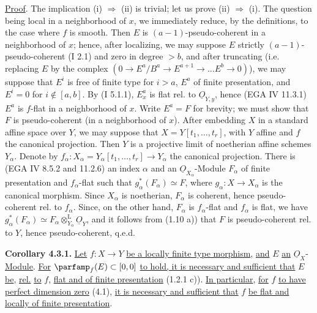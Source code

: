 \uline{Proof}. The implication (i) \(\Longrightarrow\) (ii) is trivial; let us prove (ii) \(\Longrightarrow\) (i). The question being local in a neighborhood of \(x\), we immediately reduce, by the definitions, to the case where \(f\) is smooth. Then \(E\) is \((a-1)\)-pseudo-coherent in a neighborhood of \(x\); hence, after localizing, we may suppose \(E\) strictly \((a-1)\)-pseudo-coherent (I 2.1) and zero in degree \(>b\), and after truncating (i.e. replacing \(E\) by the complex \((0\to E^a/B^a\to E^{a+1}\to\ldots E^b\to 0)\)), we may suppose that \(E^i\) is free of finite type for \(i>a\), \(E^a\) of finite presentation, and \(E^i=0\) for \(i\notin[a,b]\). By (I 5.1.1), \(E^a_x\) is flat rel. to \(\underline{O}_{Y,y}\), hence (EGA IV 11.3.1) \(E^a\) is \(f\)-flat in a neighborhood of \(x\). Write \(E^a=F\) for brevity; we must show that \(F\) is pseudo-coherent (in a neighborhood of \(x\)). After embedding \(X\) in a standard affine space over \(Y\), we may
%
suppose that \(X=Y[t_1,\dots,t_r]\), with \(Y\) affine and \(f\) the canonical projection. Then \(Y\) is a projective limit of noetherian affine schemes \(Y_\alpha\). Denote by \(f_\alpha:X_\alpha=Y_\alpha[t_1,\dots,t_r]\to Y_\alpha\) the canonical projection. There is (EGA IV 8.5.2 and 11.2.6) an index \(\alpha\) and an \(\underline{O}_{X_\alpha}\)-Module \(F_\alpha\) of finite presentation and \(f_\alpha\)-flat such that \(g_\alpha^*(F_\alpha)\simeq F\), where \(g_\alpha:X\to X_\alpha\) is the canonical morphism. Since \(X_\alpha\) is noetherian, \(F_\alpha\) is coherent, hence pseudo-coherent rel. to \(f_\alpha\). Since, on the other hand, \(F_\alpha\) is \(f_\alpha\)-flat and \(f_\alpha\) is flat, we have \(g_\alpha^*(F_\alpha)\simeq F_\alpha\otimes^{\mathrm L}_{Y_\alpha}\underline{O}_Y\), and it follows from (1.10 a)) that \(F\) is pseudo-coherent rel. to \(Y\), hence pseudo-coherent, q.e.d.

\textbf{Corollary 4.3.1.} \uline{Let} \(f:X\to Y\) \uline{be a locally finite type morphism}, \uline{and} \(E\) \uline{an} \(\underline{O}_X\)-\uline{Module}. \uline{For} \(\parfamp_f(E)\subset[0,0]\) \uline{to hold, it is necessary and sufficient that} \(E\) \uline{be}, \uline{rel.} \uline{to} \(f\), \uline{flat and of finite presentation} (1.2.1 c)). \uline{In particular}, \uline{for} \(f\) \uline{to have perfect dimension zero} (4.1), \uline{it is necessary and sufficient that} \(f\) \uline{be flat and locally of finite presentation}.

